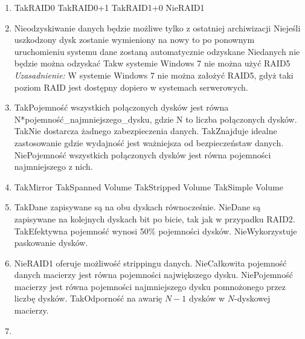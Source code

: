 \begin{enumerate}
		{Nie}{wszystkie 3 dyski spięte w RAID5}%
		{Nie}{wszystkie dyski spięte w mirror}
		\item {}%
		{Tak}{RAID0}%
		{Tak}{RAID0+1}%
		{Tak}{RAID1+0}%
		{Nie}{RAID1}
		\item {}%
		{Nie}{odzyskiwanie danych będzie możliwe tylko z ostatniej archiwizacji}%
		{Nie}{jeśli uszkodzony dysk zostanie wymieniony na nowy to po ponownym uruchomieniu systemu dane zostaną automatycznie odzyskane}%
		{Nie}{danych nie będzie można odzyskać}%
		{Tak}{w systemie Windows 7 nie można użyć RAID5}
		{\small \emph{Uzasadnienie:} W systemie Windows 7 nie można założyć RAID5, gdyż taki poziom RAID jest dostępny dopiero w systemach serwerowych.}
		\item {}%
		{Tak}{Pojemność wszystkich połączonych dysków jest równa N*pojemność\_najmniejszego\_dysku, gdzie N to liczba połączonych dysków.}%
		{Tak}{Nie dostarcza żadnego zabezpieczenia danych.}%
		{Tak}{Znajduje idealne zastosowanie gdzie wydajność jest ważniejsza od bezpieczeństaw danych.}%
		{Nie}{Pojemność wszystkich połączonych dysków jest równa pojemności najmniejszego z nich.}
		\item {}%
		{Tak}{Mirror}%
		{Tak}{Spanned Volume}%
		{Tak}{Stripped Volume}%
		{Tak}{Simple Volume}
		\item {}%
		{Tak}{Dane zapisywane są na obu dyskach równocześnie.}%
		{Nie}{Dane są zapisywane na kolejnych dyskach bit po bicie, tak jak w przypadku RAID2.}%
		{Tak}{Efektywna pojemność wynosi 50\% pojemności dysków.}%
		{Nie}{Wykorzystuje paskowanie dysków.}
		\item {}%
		{Nie}{RAID1 oferuje możliwość strippingu danych.}%
		{Nie}{Całkowita pojemność danych macierzy jest równa pojemności największego dysku.}%
		{Nie}{Pojemność macierzy jest równa pojemności najmniejszego dysku pomnożonego przez liczbę dysków.}%
		{Tak}{Odporność na awarię $ N-1 $ dysków w $ N $-dyskowej macierzy.}
		\newpage
		\item {}%

\end{enumerate}
